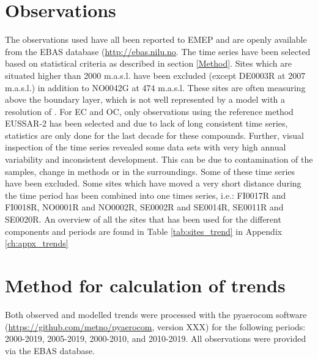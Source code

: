 \section{\label{OBSTrends}{Observations}}
The observations used have all been reported to EMEP and are openly available from the EBAS database (\url{http://ebas.nilu.no}. The time series have been selected based on statistical criteria as described in section  \ref{Method}. Sites which are situated higher than 2000 m.a.s.l. have been excluded (except DE0003R at 2007 m.a.s.l.) in addition to NO0042G at 474 m.a.s.l. These sites are often measuring above the boundary layer, which is not well represented by a model with a resolution of \resZO. For EC and OC, only observations using the reference method EUSSAR-2 \citep{Cavalli:EUSAAR} has been selected and due to lack of long consistent time series, statistics are only done for the last decade for these compounds. Further, visual inspection of the time series revealed some data sets with very high annual variability and inconsistent development. This can be due to contamination of the samples, change in methods or in the surroundings. Some of these time series have been excluded. Some sites which have moved a very short distance during the time period has been combined into one times series, i.e.: FI0017R and FI0018R, NO0001R and NO0002R, SE0002R and SE0014R, SE0011R and SE0020R. An overview of all the sites that has been used for the different components and periods are found in Table \ref{tab:sites_trend} in Appendix \ref{ch:appx_trends}

\section{\label{Method}{Method for calculation of trends}}
Both observed and modelled trends were processed with the pyaerocom software (\url{https://github.com/metno/pyaerocom}, version XXX) for the following periods: 2000-2019, 2005-2019, 2000-2010, and 2010-2019. All observations were provided via the EBAS database. 

